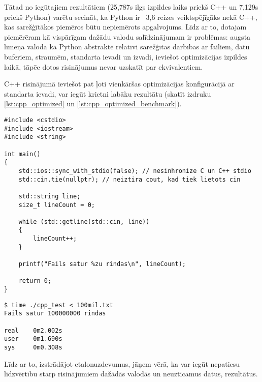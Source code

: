 Tātad no iegūtajiem rezultātiem (25,787s ilgs izpildes laiks priekš C++ un
7,129s priekš Python) varētu secināt, ka Python ir ~3,6 reizes veiktspējīgāks
nekā C++, kas sarežģītākos piemēros būtu nepiemērots apgalvojums. Līdz ar to,
dotajam piemērēram kā vispārīgam dažādu valodu salīdzinājumam ir problēmas:
augsta līmeņa valoda kā Python abstraktē relatīvi sarežģītas darbības ar
failiem, datu buferiem, straumēm, standarta ievadi un izvadi, ieviešot optimizācijas
izpildes laikā, tāpēc dotos risinājumus nevar uzskatīt par ekvivalentiem.

C++ risinājumā ieviešot pat ļoti vienkāršas optimizācijas konfigurācijā ar
standarta ievadi, var iegūt krietni labāku rezultātu (skatīt izdruku
\ref{lst:cpp_optimized} un \ref{lst:cpp_optimized_benchmark}).

\begin{lstlisting}[caption={Optimizēta vienkārša faila apstrāde valodā C++ caur standarta ievadi },
  label=lst:cpp_optimized,
  captionpos=t
]
#include <cstdio>
#include <iostream>
#include <string>

int main()
{
    std::ios::sync_with_stdio(false); // nesinhronize C un C++ stdio 
    std::cin.tie(nullptr); // neiztira cout, kad tiek lietots cin

    std::string line;
    size_t lineCount = 0;

    while (std::getline(std::cin, line))
    {
        lineCount++;
    }

    printf("Fails satur %zu rindas\n", lineCount);

    return 0;
}
\end{lstlisting}


\begin{lstlisting}[caption={Optimizētā C++ etalonuzdevuma rezultāti failam ar 100 miljoniem rindu},
  label=lst:cpp_optimized_benchmark,
  captionpos=t
]
$ time ./cpp_test < 100mil.txt 
Fails satur 100000000 rindas 

real    0m2.002s
user    0m1.690s
sys     0m0.308s
\end{lstlisting}

Līdz ar to, izstrādājot etalonuzdevumus, jāņem vērā, ka var iegūt nepatiesu
līdzvērtību starp risinājumiem dažādās valodās un neuzticamus datus,
rezultātus.

